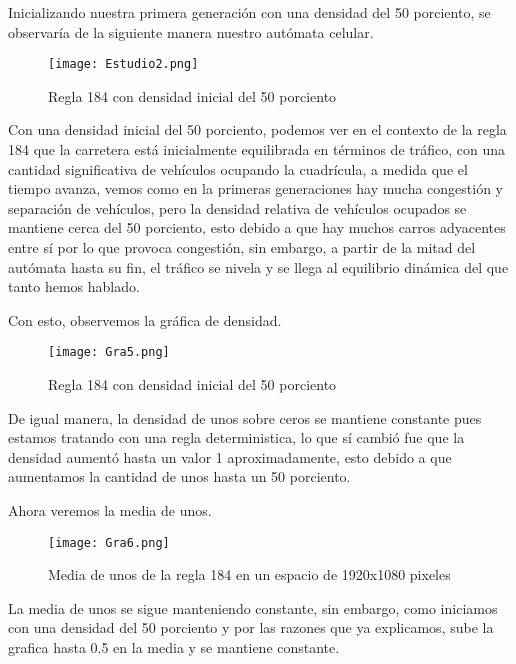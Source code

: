 \documentclass{article}
\begin{document}
\begin{itemize}
		Inicializando nuestra primera generación con una densidad del 50 porciento, se observaría de la siguiente manera nuestro autómata celular.
		\vspace{300pt}
		\begin{figure}[h]
			\centering       
			\texttt{[image: Estudio2.png]}
			\caption{Regla 184 con densidad inicial del 50 porciento}
			\label{fig:mi_imagen1}
		\end{figure}
		
		Con una densidad inicial del 50 porciento, podemos ver en el contexto de la regla 184 que la carretera está inicialmente equilibrada en términos de tráfico, con una cantidad significativa de vehículos ocupando la cuadrícula, a medida que el tiempo avanza, vemos como en la primeras generaciones hay mucha congestión y separación de vehículos, pero la densidad relativa de vehículos ocupados se mantiene cerca del 50 porciento, esto debido a que hay muchos carros adyacentes entre sí por lo que provoca congestión, sin embargo, a partir de la mitad del autómata hasta su fin, el tráfico se nivela y se llega al equilibrio dinámica del que tanto hemos hablado. 
		
		Con esto, observemos la gráfica de densidad.
		
		\begin{figure}[h]
			\centering       
			\texttt{[image: Gra5.png]}
			\caption{Regla 184 con densidad inicial del 50 porciento}
			\label{fig:mi_imagen1}
		\end{figure}
		
		De igual manera, la densidad de unos sobre ceros se mantiene constante pues estamos tratando con una regla deterministica, lo que sí cambió fue que la densidad aumentó hasta un valor 1 aproximadamente, esto debido a que aumentamos la cantidad de unos hasta un 50 porciento.
		
		Ahora veremos la media de unos. 
		
		\begin{figure}[h]
			\centering       
			\texttt{[image: Gra6.png]}
			\caption{Media de unos de la regla 184 en un espacio de 1920x1080 pixeles}
			\label{fig:mi_imagen1}
		\end{figure}
		\vspace{300pt}
		La media de unos se sigue manteniendo constante, sin embargo, como iniciamos con una densidad del 50 porciento y por las razones que ya explicamos, sube la grafica hasta 0.5 en la media y se mantiene constante. 
		

\end{itemize}
\end{document}
